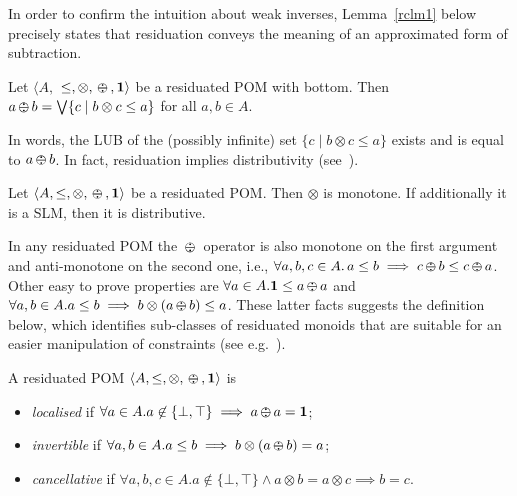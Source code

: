 \documentclass{llncs}
\def\1{{\mathbf 1}}
\def\monid{{\mathbf 0}}
\def\1{{\mathbf 1}}
\def\monop{\otimes}
\def\odiv{\, {\ominus\hspace{-7.7pt} \div} \,}
\def\monid{\mathbf{1}}
\begin{document}
%

In order to confirm the intuition about weak inverses,
Lemma~\ref{rclm1} below precisely states that residuation conveys the meaning of 
an approximated form of subtraction.
%

\begin{lemma}\label{rclm1}
	Let $\langle A,$ $\leq, \otimes,  \odiv, \1 \rangle$ be a residuated POM with bottom.
	Then $a \odiv b = \bigvee \{c \mid b \otimes c \leq a\}$ for all $a, b \in A$.
\end{lemma}

In words, the LUB of the (possibly infinite) set 
$\{c \mid b \otimes c \leq a\}$ exists and is equal to $a \odiv b$.
%
In fact, residuation implies distributivity (see~\cite[Lemma 2.2]{ipl17}).

\begin{lemma}\label{rclm2}
	Let $\langle A, \leq, \monop, \odiv, \1 \rangle$ be a residuated POM. 
	Then $\monop$ is monotone.
	If additionally it is a SLM, then it is distributive.
\end{lemma}



In any residuated POM the $\odiv$ operator is also monotone on the first argument and 
anti-monotone on the second one, i.e., 
$\forall a, b, c \in A.\, a\leq b \implies  c\odiv b \leq c \odiv a$.
%
Other easy to prove properties are
$\forall a\in A. \monid \leq a \odiv a$ and
$\forall a, b \in A. a \leq b \implies b \monop (a \odiv b) \leq a$.
These latter facts suggests the definition below, which identifies sub-classes 
of residuated monoids that are suitable for an easier manipulation
of constraints (see e.g.~\cite{ecai06}).

\begin{definition}[Families]
	A residuated POM $\langle A, \leq, \monop, \odiv, \monid \rangle$ is
	\begin{itemize}
		\item
		\emph{localised} if $\forall a \in A. a \not \in \{\bot,\top\} \implies a \odiv a = \1$;
		\item
		\emph{invertible} if $\forall a, b \in A. a \leq b \implies b \monop (a \odiv b) = a$;
		\item
		\emph{cancellative} if $\forall a, b, c \in A. a \not \in \{\bot,\top\} \wedge a \otimes b = a  \otimes c \implies b = c$.
	\end{itemize}
\end{definition}
\end{document}
